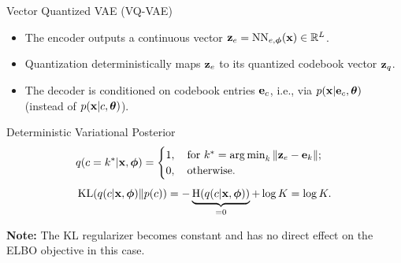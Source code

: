 \documentclass{beamer}
\begin{document}
\begin{frame}{Vector Quantized VAE (VQ-VAE)}
	\begin{itemize}
		\item The encoder outputs a continuous vector $\mathbf{z}_e = \text{NN}_{e, \boldsymbol{\phi}}(\mathbf{x}) \in \mathbb{R}^{L}$.
		\item Quantization deterministically maps $\mathbf{z}_e$ to its quantized codebook vector $\mathbf{z}_q$.
		\item The decoder is conditioned on codebook entries $\mathbf{e}_c$, i.e., via $p(\mathbf{x} | \mathbf{e}_c, \boldsymbol{\theta})$ (instead of $p(\mathbf{x} | c, \boldsymbol{\theta})$).
	\end{itemize}
    \eqpause
	\begin{block}{Deterministic Variational Posterior}
		\vspace{-0.3cm}
		\[
			q(c = k^* | \mathbf{x}, \boldsymbol{\phi}) = \begin{cases}
				1 , \quad \text{for } k^* = \operatorname*{arg\,min}_k \| \mathbf{z}_e - \mathbf{e}_k \|; \\
				0, \quad \text{otherwise}.
		\end{cases}
		\]
        \eqpause
		\[
			\mathrm{KL}(q(c | \mathbf{x}, \boldsymbol{\phi}) \| p(c)) = - \underbrace{\mathrm{H}(q(c | \mathbf{x}, \boldsymbol{\phi}))}_{=0} + \log K = \log K. 
		\]
        \eqpause
	\end{block}	
	\vspace{-0.4cm}
	\textbf{Note:} The KL regularizer becomes constant and has no direct effect on the ELBO objective in this case.
\end{frame}
\end{document}
